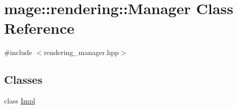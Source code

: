 \hypertarget{classmage_1_1rendering_1_1_manager}{}\section{mage\+:\+:rendering\+:\+:Manager Class Reference}
\label{classmage_1_1rendering_1_1_manager}


{\ttfamily \#include $<$rendering\+\_\+manager.\+hpp$>$}

\subsection*{Classes}
\begin{DoxyCompactItemize}
\item 
class \mbox{\hyperlink{classmage_1_1rendering_1_1_manager_1_1_impl}{Impl}}
\end{DoxyCompactItemize}
